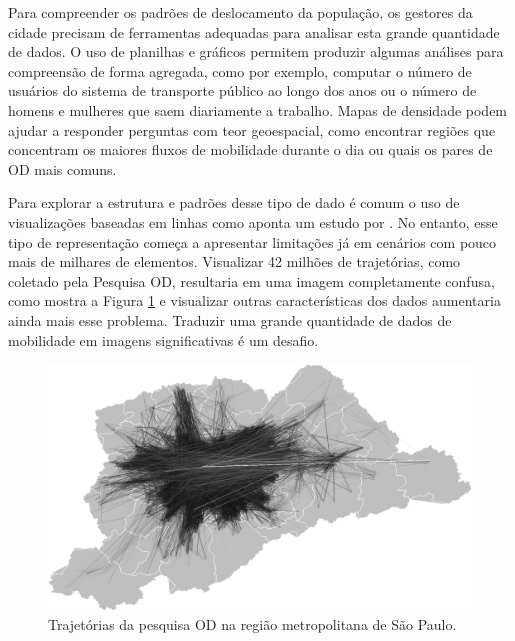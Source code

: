 Para compreender os padrões de deslocamento da população, os gestores da cidade
precisam de ferramentas adequadas para analisar esta grande quantidade de
dados. O uso de planilhas e gráficos permitem produzir algumas análises para
compreensão de forma agregada,  como por exemplo, computar o número de usuários
do sistema de transporte público ao longo dos anos ou o número de homens e
mulheres que saem diariamente a trabalho. Mapas de densidade podem ajudar a
responder perguntas com teor geoespacial, como encontrar regiões que concentram
os maiores fluxos de mobilidade durante o dia ou quais os pares de OD mais
comuns. 

Para explorar a estrutura e padrões desse tipo de dado é comum o uso de 
visualizações baseadas em linhas como aponta um estudo por \cite{Chen2015}. No entanto,
esse tipo de representação começa a apresentar limitações já em cenários com
pouco mais de milhares de elementos. Visualizar 42 milhões de trajetórias, como
coletado pela Pesquisa OD, resultaria em uma imagem completamente confusa, como
mostra a Figura \ref{fig:cluttered-graph} e visualizar outras características
dos dados aumentaria ainda mais esse problema. Traduzir uma grande quantidade
de dados de mobilidade em imagens significativas é um desafio.

\begin{figure}[!htb]
  \centering
  \includegraphics[width=150mm]{../figuras/unbundled-edges+grayscale+512px.png}
  \caption[Trajetórias da pesquisa OD na região metropolitana de S\~ao Paulo]{Trajetórias da pesquisa
OD na região metropolitana de S\~ao Paulo. \label{fig:cluttered-graph}}
  
\end{figure}

